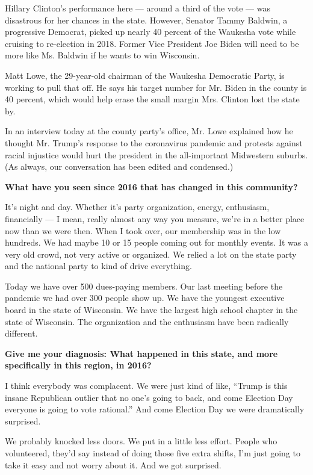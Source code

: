Hillary Clinton's performance here --- around a third of the vote ---
was disastrous for her chances in the state. However, Senator Tammy
Baldwin, a progressive Democrat, picked up nearly 40 percent of the
Waukesha vote while cruising to re-election in 2018. Former Vice
President Joe Biden will need to be more like Ms. Baldwin if he wants to
win Wisconsin.

Matt Lowe, the 29-year-old chairman of the Waukesha Democratic Party, is
working to pull that off. He says his target number for Mr. Biden in the
county is 40 percent, which would help erase the small margin Mrs.
Clinton lost the state by.

In an interview today at the county party's office, Mr. Lowe explained
how he thought Mr. Trump's response to the coronavirus pandemic and
protests against racial injustice would hurt the president in the
all-important Midwestern suburbs. (As always, our conversation has been
edited and condensed.)

\textbf{What have you seen since 2016 that has changed in this
community?}

It's night and day. Whether it's party organization, energy, enthusiasm,
financially --- I mean, really almost any way you measure, we're in a
better place now than we were then. When I took over, our membership was
in the low hundreds. We had maybe 10 or 15 people coming out for monthly
events. It was a very old crowd, not very active or organized. We relied
a lot on the state party and the national party to kind of drive
everything.

Today we have over 500 dues-paying members. Our last meeting before the
pandemic we had over 300 people show up. We have the youngest executive
board in the state of Wisconsin. We have the largest high school chapter
in the state of Wisconsin. The organization and the enthusiasm have been
radically different.

\textbf{Give me your diagnosis: What happened in this state, and more
specifically in this region, in 2016?}

I think everybody was complacent. We were just kind of like, ``Trump is
this insane Republican outlier that no one's going to back, and come
Election Day everyone is going to vote rational.'' And come Election Day
we were dramatically surprised.

We probably knocked less doors. We put in a little less effort. People
who volunteered, they'd say instead of doing those five extra shifts,
I'm just going to take it easy and not worry about it. And we got
surprised.

